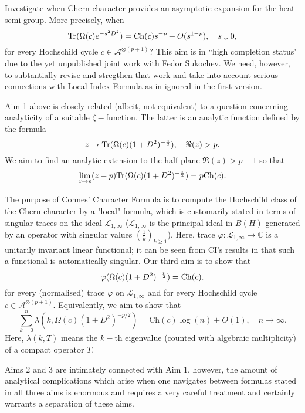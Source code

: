 \documentclass[12pt]{article}
\begin{document}
 Investigate when Chern character provides an asymptotic expansion for the heat semi-group. More precisely, when 
\begin{equation}\label{heat eq}
{\rm Tr}(\Omega(c)e^{-s^2D^2})={\rm Ch}(c)s^{-p}+O(s^{1-p}),\quad s\downarrow0,
\end{equation}
for every Hochschild cycle $c\in\mathcal{A}^{\otimes (p+1)}?$ This aim is in ``high completion status" due to the yet unpublished joint work with Fedor Sukochev. We need, however, to subtantially revise and stregthen that work and take into account serious connections with Local Index Formula as in \cite{ConnesMoscovici, CGRS} ignored in the first version.

 Aim 1 above is closely related (albeit, not equivalent) to a question concerning analyticity of a suitable $\zeta-$function. The latter is an analytic function defined by the formula
$$z\to {\rm Tr}(\Omega(c)(1+D^2)^{-\frac{z}{2}}),\quad \Re(z)>p.$$
We aim to find an analytic extension to the half-plane $\Re(z)>p-1$ so that
$$\lim_{z\to p}(z-p){\rm Tr}(\Omega(c)(1+D^2)^{-\frac{z}{2}})=p{\rm Ch}(c).$$

 The purpose of Connes' Character Formula is to compute the Hochschild class of the Chern character by a "local" formula, which is customarily  stated in terms of singular traces on the ideal $\mathcal{L}_{1,\infty}$ ($\mathcal{L}_{1,\infty}$ is the principal ideal in $B(H)$ generated by an operator with singular values $(\frac1k)_{k\geq1}$). Here, trace $\varphi:\mathcal{L}_{1,\infty}\to\mathbb{C}$ is a unitarily invariant linear functional; it can be seen from CI's results in \cite{book} that such a functional is automatically singular. Our third aim is to show that
\begin{equation}\label{super main eq}
\varphi(\Omega(c)(1+D^2)^{-\frac{p}{2}})={\rm Ch}(c).
\end{equation}
for every (normalised) trace $\varphi$ on $\mathcal{L}_{1,\infty}$ and for every Hochschild cycle $c\in\mathcal{A}^{\otimes (p+1)}.$ Equivalently, we aim to show that
$$\sum_{k=0}^n \lambda(k,\Omega(c)(1+D^2)^{-p/2}) = \mathrm{Ch}(c)\log(n)+O(1),\quad n\to\infty.$$
Here, $\lambda(k,T)$ means the $k-$th eigenvalue (counted with algebraic multiplicity) of a compact operator $T.$

Aims 2 and 3 are intimately connected with Aim 1, however, the amount of analytical complications which arise when one navigates between formulas stated in all three aims is enormous and requires a very careful treatment and certainly warrants a separation of these aims.
\end{document}
